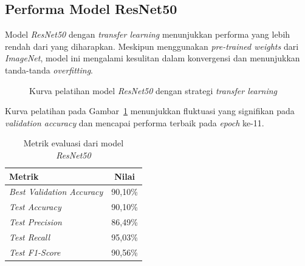 \subsection{Performa Model ResNet50}

Model \textit{ResNet50} dengan \textit{transfer learning} menunjukkan performa yang lebih rendah dari yang diharapkan. Meskipun menggunakan \textit{pre-trained weights} dari \textit{ImageNet}, model ini mengalami kesulitan dalam konvergensi dan menunjukkan tanda-tanda \textit{overfitting}.

\begin{figure}[H]
    \centering
    \caption{Kurva pelatihan model \textit{ResNet50} dengan strategi \textit{transfer learning}}
    \label{fig:resnet_training}
\end{figure}

Kurva pelatihan pada Gambar~\ref{fig:resnet_training} menunjukkan fluktuasi yang signifikan pada \textit{validation accuracy} dan mencapai performa terbaik pada \textit{epoch} ke-11.

\begin{table}[H]
\centering
\caption{Metrik evaluasi dari model \textit{ResNet50}}
\label{tab:resnet_results}
\begin{tabular}{|l|c|}
\hline
\textbf{Metrik} & \textbf{Nilai} \\
\hline
\textit{Best Validation Accuracy} & 90,10\% \\
\textit{Test Accuracy} & 90,10\% \\
\textit{Test Precision} & 86,49\% \\
\textit{Test Recall} & 95,03\% \\
\textit{Test F1-Score} & 90,56\% \\
\hline
\end{tabular}
\end{table}

